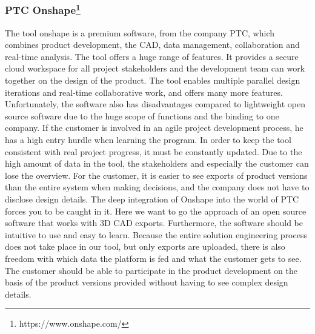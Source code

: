     \subsubsection*{PTC Onshape\footnote{https://www.onshape.com/}}
    The tool onshape is a premium software, from the company PTC, which combines product development, the CAD, data management, collaboration and real-time analysis. The tool offers a huge range of features. It provides a secure cloud workspace for all project stakeholders and the development team can work together on the design of the product. The tool enables multiple parallel design iterations and real-time collaborative work, and offers many more features. 
    Unfortunately, the software also has disadvantages compared to lightweight open source software due to the huge scope of functions and the binding to one company. If the customer is involved in an agile project development process, he has a high entry hurdle when learning the program.  In order to keep the tool consistent with real project progress, it must be constantly updated. Due to the high amount of data in the tool, the stakeholders and especially the customer can lose the overview. For the customer, it is easier to see exports of product versions than the entire system when making decisions, and the company does not have to disclose design details. The deep integration of Onshape into the world of PTC forces you to be caught in it. 
    Here we want to go the approach of an open source software that works with 3D CAD exports. Furthermore, the software should be intuitive to use and easy to learn. Because the entire solution engineering process does not take place in our tool, but only exports are uploaded, there is also freedom with which data the platform is fed and what the customer gets to see. The customer should be able to participate in the product development on the basis of the product versions provided without having to see complex design details.

